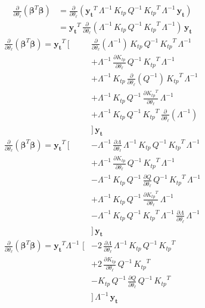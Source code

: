 \documentclass[11pt,a4paper]{article}
\numberwithin{equation}{section}
\begin{document}
\begin{align}
\frac{\partial }{\partial \theta_\ell}\left({\bm \beta}^T{\bm \beta}\right)
  &= \frac{\partial }{\partial \theta_\ell}\left(\mathbf{y_t}^T\,\Lambda^{-1}\,K_{tp}\,Q^{-1}\,{K_{tp}}^T\,\Lambda^{-1}\,\mathbf{y_t}\right) \\
  &= \mathbf{y_t}^T\,\frac{\partial }{\partial \theta_\ell}\left(\Lambda^{-1}\,K_{tp}\,Q^{-1}\,{K_{tp}}^T\,\Lambda^{-1}\right)\,\mathbf{y_t}
\end{align}
\begin{align}
\frac{\partial }{\partial \theta_\ell}\left({\bm \beta}^T{\bm \beta}\right) = \mathbf{y_t}^T\,[
   &\frac{\partial }{\partial \theta_\ell}\left(\Lambda^{-1}\right)\,K_{tp}\,Q^{-1}\,{K_{tp}}^T\,\Lambda^{-1}\\
   &+\Lambda^{-1}\,\frac{\partial K_{tp}}{\partial \theta_\ell}\,Q^{-1}\,{K_{tp}}^T\,\Lambda^{-1} \\
   &+\Lambda^{-1}\,K_{tp}\,\frac{\partial }{\partial \theta_\ell}\left(Q^{-1}\right)\,{K_{tp}}^T\,\Lambda^{-1} \\
   &+\Lambda^{-1}\,K_{tp}\,Q^{-1}\,\frac{\partial {K_{tp}}^T}{\partial \theta_\ell}\,\Lambda^{-1} \\
   &+\Lambda^{-1}\,K_{tp}\,Q^{-1}\,{K_{tp}}^T\,\frac{\partial }{\partial \theta_\ell}\left(\Lambda^{-1}\right) \\
   &]\,\mathbf{y_t} \\
\frac{\partial }{\partial \theta_\ell}\left({\bm \beta}^T{\bm \beta}\right) = \mathbf{y_t}^T\,[
   &-\Lambda^{-1}\,\frac{\partial \Lambda}{\partial \theta_\ell}\,\Lambda^{-1}\,K_{tp}\,Q^{-1}\,{K_{tp}}^T\,\Lambda^{-1}\\
   &+\Lambda^{-1}\,\frac{\partial K_{tp}}{\partial \theta_\ell}\,Q^{-1}\,{K_{tp}}^T\,\Lambda^{-1} \\
   &-\Lambda^{-1}\,K_{tp}\,Q^{-1}\,\frac{\partial Q}{\partial \theta_\ell}\,Q^{-1}\,{K_{tp}}^T\,\Lambda^{-1} \\
   &+\Lambda^{-1}\,K_{tp}\,Q^{-1}\,\frac{\partial {K_{tp}}^T}{\partial \theta_\ell}\,\Lambda^{-1} \\
   &-\Lambda^{-1}\,K_{tp}\,Q^{-1}\,{K_{tp}}^T\,\Lambda^{-1}\,\frac{\partial \Lambda}{\partial \theta_\ell}\,\Lambda^{-1} \\
   &]\,\mathbf{y_t} \\
\frac{\partial }{\partial \theta_\ell}\left({\bm \beta}^T{\bm \beta}\right) = \mathbf{y_t}^T\Lambda^{-1}\,\,[
   &-2\,\frac{\partial \Lambda}{\partial \theta_\ell}\,\Lambda^{-1}\,K_{tp}\,Q^{-1}\,{K_{tp}}^T\\
   &+2\,\frac{\partial K_{tp}}{\partial \theta_\ell}\,Q^{-1}\,{K_{tp}}^T \\
   &-K_{tp}\,Q^{-1}\,\frac{\partial Q}{\partial \theta_\ell}\,Q^{-1}\,{K_{tp}}^T \\
   &]\,\Lambda^{-1}\,\mathbf{y_t}
\end{align}
\end{document}
